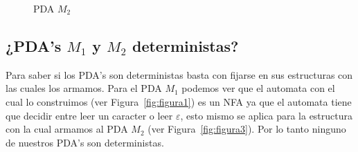 \documentclass[spanish]{article}
\begin{document}
  \begin{figure}[H]
    \centering
    \label{fig:figura4}
    \caption{PDA $M_2$}
  \end{figure}

\subsection{¿PDA's $M_1$ y $M_2$ deterministas?}
  Para saber si los PDA's son deterministas basta con fijarse en sus estructuras con las cuales los armamos.
  Para el PDA $M_1$ podemos ver que el automata con el cual lo construimos (ver Figura~\ref{fig:figura1}) es un NFA ya
  que el automata tiene que decidir entre leer un caracter o leer $\varepsilon$, esto mismo se aplica para la estructura
  con la cual armamos al PDA $M_2$ (ver Figura~\ref{fig:figura3}).
  Por lo tanto ninguno de nuestros PDA's son deterministas.
\end{document}
